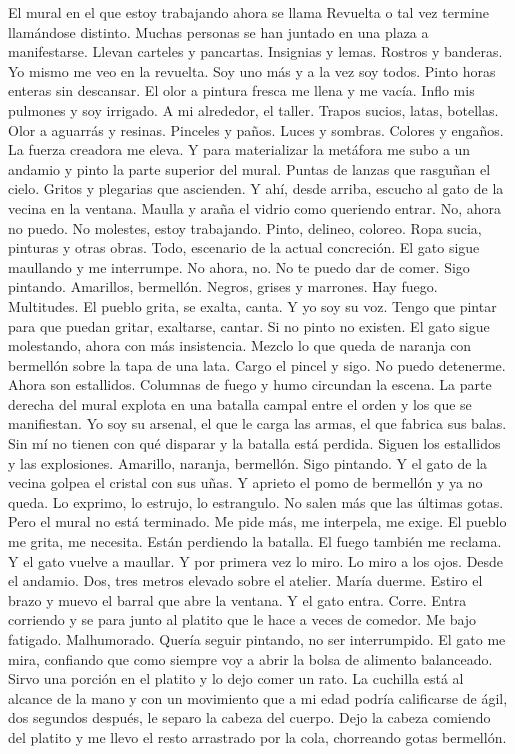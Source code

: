 \documentclass[11pt,twoside,openright,a6paper]{book}
\begin{document}
El mural en el que estoy trabajando ahora se llama Revuelta o tal vez termine llamándose distinto. Muchas personas se han juntado en una plaza a manifestarse. Llevan carteles y pancartas. Insignias y lemas. Rostros y banderas. Yo mismo me veo en la revuelta. Soy uno más y a la vez soy todos. Pinto horas enteras sin descansar. El olor a pintura fresca me llena y me vacía. Inflo mis pulmones y soy irrigado. A mi alrededor, el taller. Trapos sucios, latas, botellas. Olor a aguarrás y resinas. Pinceles y paños. Luces y sombras. Colores y engaños. La fuerza creadora me eleva. Y para materializar la metáfora me subo a un andamio y pinto la parte superior del mural. Puntas de lanzas que rasguñan el cielo. Gritos y plegarias que ascienden. Y ahí, desde arriba, escucho al gato de la vecina en la ventana. Maulla y araña el vidrio como queriendo entrar. No, ahora no puedo. No molestes, estoy trabajando. Pinto, delineo, coloreo. Ropa sucia, pinturas y otras obras. Todo, escenario de la actual concreción. El gato sigue maullando y me interrumpe. No ahora, no. No te puedo dar de comer. Sigo pintando. Amarillos, bermellón. Negros, grises y marrones. Hay fuego. Multitudes. El pueblo grita, se exalta, canta. Y yo soy su voz. Tengo que pintar para que puedan gritar, exaltarse, cantar. Si no pinto no existen. El gato sigue molestando, ahora con más insistencia. Mezclo lo que queda de naranja con bermellón sobre la tapa de una lata. Cargo el pincel y sigo. No puedo detenerme. Ahora son estallidos. Columnas de fuego y humo circundan la escena. La parte derecha del mural explota en una batalla campal entre el orden y los que se manifiestan. Yo soy su arsenal, el que le carga las armas, el que fabrica sus balas. Sin mí no tienen con qué disparar y la batalla está perdida. Siguen los estallidos y las explosiones. Amarillo, naranja, bermellón. Sigo pintando. Y el gato de la vecina golpea el cristal con sus uñas. Y aprieto el pomo de bermellón y ya no queda. Lo exprimo, lo estrujo, lo estrangulo. No salen más que las últimas gotas. Pero el mural no está terminado. Me pide más, me interpela, me exige. El pueblo me grita, me necesita. Están perdiendo la batalla. El fuego también me reclama. Y el gato vuelve a maullar. Y por primera vez lo miro. Lo miro a los ojos. Desde el andamio. Dos, tres metros elevado sobre el atelier. María duerme. Estiro el brazo y muevo el barral que abre la ventana. Y el gato entra. Corre. Entra corriendo y se para junto al platito que le hace a veces de comedor. Me bajo fatigado. Malhumorado. Quería seguir pintando, no ser interrumpido. El gato me mira, confiando que como siempre voy a abrir la bolsa de alimento balanceado. Sirvo una porción en el platito y lo dejo comer un rato. La cuchilla está al alcance de la mano y con un movimiento que a mi edad podría calificarse de ágil, dos segundos después, le separo la cabeza del cuerpo. Dejo la cabeza comiendo del platito y me llevo el resto arrastrado por la cola, chorreando gotas bermellón.
\end{document}
